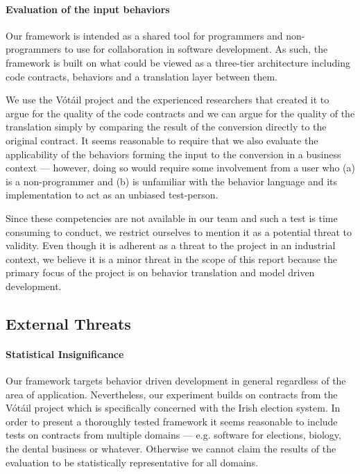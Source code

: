 \paragraph{Evaluation of the input behaviors}
Our framework is intended as a shared tool for programmers and non-programmers to use for collaboration in software development. As such, the framework is built on what could be viewed as a three-tier architecture including code contracts, behaviors and a translation layer between them.
 
We use the V\'{o}t\'{a}il project and the experienced researchers that created it to argue for the quality of the code contracts and we can argue for the quality of the translation simply by comparing the result of the conversion directly to the original contract. It seems reasonable to require that we also evaluate the applicability of the behaviors forming the input to the conversion in a business context --- however, doing so would require some involvement from a user who (a) is a non-programmer and (b) is unfamiliar with the behavior language and its implementation to act as an unbiased test-person.

Since these competencies are not available in our team and such a test is time consuming to conduct, we restrict ourselves to mention it as a potential threat to validity. Even though it is adherent as a threat to the project in an industrial context, we believe it is a minor threat in the scope of this report because the primary focus of the project is on behavior translation and model driven development.

\subsection{External Threats}
\paragraph{Statistical Insignificance}
Our framework targets behavior driven development in general regardless of the area of application. Nevertheless, our experiment builds on contracts from the V\'{o}t\'{a}il project which is specifically concerned with the Irish election system. In order to present a thoroughly tested framework it seems reasonable to include tests on contracts from multiple domains --- e.g. software for elections, biology, the dental business or whatever. Otherwise we cannot claim the results of the evaluation to be statistically representative for all domains.
 

